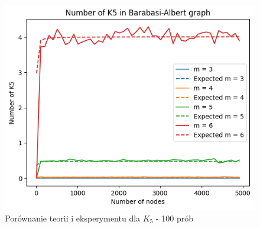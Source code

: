 \documentclass{article}
\begin{document}
\begin{figure}[h!]
  \centering
  \includegraphics[width=13cm]{../k5.png}
  \caption{Porównanie teorii i eksperymentu dla $K_{5}$ - 100 prób}
\end{figure}

\newpage
\end{document}
